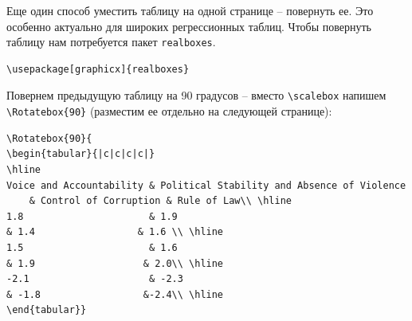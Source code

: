 \documentclass[12pt]{article}
\begin{document}
\begin{table}[ht!]
\centering
\caption{WGI random values}
\end{table}

Еще один способ уместить таблицу на одной странице -- повернуть ее. Это особенно актуально для широких регрессионных таблиц. Чтобы повернуть таблицу нам потребуется пакет \texttt{realboxes}.

\begin{center}
\begin{BVerbatim}
\usepackage[graphicx]{realboxes}
\end{BVerbatim}
\end{center}

 Повернем предыдущую таблицу на 90 градусов -- вместо \texttt{\textbackslash scalebox} напишем \texttt{\textbackslash Rotatebox\{90\}} (разместим ее отдельно на следующей странице):\medskip\\

 
\begin{BVerbatim}
\Rotatebox{90}{
\begin{tabular}{|c|c|c|c|}
\hline
Voice and Accountability & Political Stability and Absence of Violence 
	& Control of Corruption & Rule of Law\\ \hline
1.8                      & 1.9                                         & 1.4                  & 1.6 \\ \hline
1.5                      & 1.6                                         & 1.9                   & 2.0\\ \hline
-2.1                     & -2.3                                        & -1.8                  &-2.4\\ \hline
\end{tabular}}
\end{BVerbatim}
\end{document}
